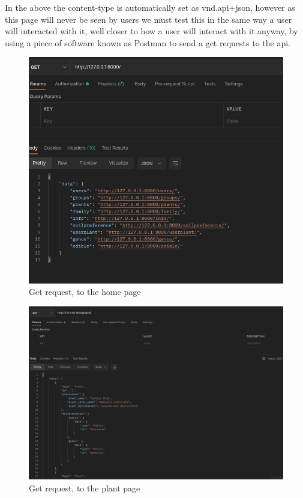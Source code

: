 \documentclass{article}
\begin{document}
    In the above the content-type is automatically set as vnd.api+json, however as this page will never be seen by users we must test this in the same way a user will interacted with it, well closer to how a user will interact with it anyway, by using a piece of software known as Postman to send a get requests to the api.
    
    
    \begin{figure}[!htb]
        \centering
        \caption{Get request, to the home page}
        \includegraphics[scale=0.50]{format3}
    \end{figure}

    
    \begin{figure}[!htb]
        \centering
        \caption{Get request, to the plant page}
        \includegraphics[scale=0.50]{format4}
    \end{figure}
\end{document}
